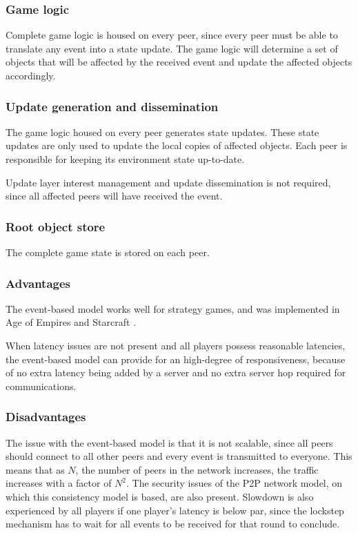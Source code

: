 \subsubsection{Game logic}
Complete game logic is housed on every peer, since every peer must be able to translate any event into a state update. The game logic will determine a set of objects that will be affected by the received event and update the affected objects accordingly.

\subsubsection{Update generation and dissemination}

The game logic housed on every peer generates state updates. These state updates are only used to update the local copies of affected objects. Each peer is responsible for keeping its environment state up-to-date.

Update layer interest management and update dissemination is not required, since all affected peers will have received the event.

\subsubsection{Root object store}

The complete game state is stored on each peer.

\subsubsection{Advantages}
The event-based model works well for strategy games, and was implemented
in Age of Empires \cite{p2p_cm_aoe} and Starcraft \cite{starcraft_network_model}.

When latency issues are not present and all players possess reasonable
latencies, the event-based model can provide for an high-degree of responsiveness, because of no extra latency being added by a server and no extra server hop required for communications.

\subsubsection{Disadvantages}
The issue with the event-based model is that it is not scalable, since all peers should connect to all other peers and every event is transmitted to
everyone. This means that as $N$, the number of peers in the network increases, the traffic increases with a factor of $N^2$. The security issues of
the P2P network model, on which this consistency model is based, are also present. Slowdown is also experienced by all players if one player's
latency is below par, since the lockstep mechanism has to wait for all events to be received for that round to conclude.

